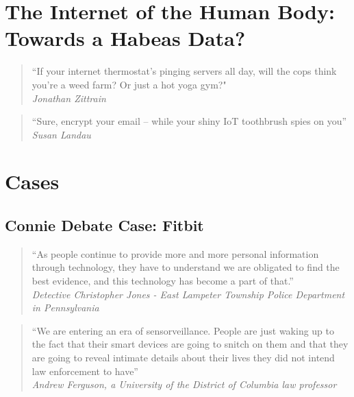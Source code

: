 \section{The Internet of the Human Body: Towards a Habeas Data?}
\begin{multicols}{2}
    \begin{quote}
        “If your internet thermostat's pinging servers all day, will the cops think you're a weed farm? Or just a hot yoga gym?" \\ \textit{Jonathan Zittrain}
    \end{quote}

    \begin{quote}
        “Sure, encrypt your email – while your shiny IoT toothbrush spies on you” \\ \textit{Susan Landau}
    \end{quote}
\end{multicols}

\newpage

\section{Cases}

\subsection{Connie Debate Case: Fitbit}

\begin{multicols}{2}
    \begin{quote}
        “As people continue to provide more and more personal information through technology, they have to understand we are obligated to find the best evidence, and this technology has become a part of that.”  \\
        \textit{Detective Christopher Jones - East Lampeter Township Police Department in Pennsylvania}
    \end{quote}

    \begin{quote}
        “We are entering an era of sensorveillance. People are just waking up to the fact that their smart devices are going to snitch on them and that they are going to reveal intimate details about their lives they did not intend law enforcement to have”  \\
        \textit{Andrew Ferguson, a University of the District of Columbia law professor}
    \end{quote}
\end{multicols}



